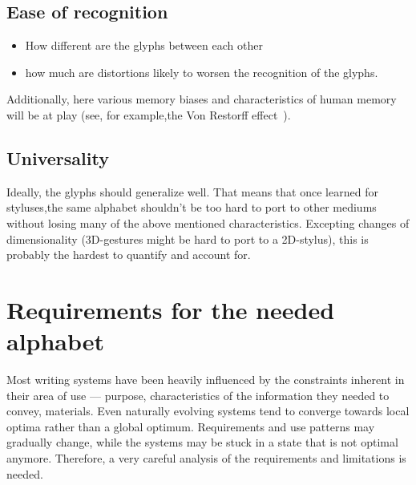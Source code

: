 \documentclass[conference]{IEEEtran}
\begin{document}
\subsection{Ease of recognition}

\begin{itemize} 
        \item How different are the glyphs between each other
        \item how much are distortions likely to worsen the recognition of the glyphs.
\end{itemize}

Additionally,  here various memory biases and characteristics of human memory will be at play (see, for example,the Von Restorff effect~\cite{hunt1995subtlety}).

\subsection{Universality}

Ideally, the glyphs should generalize well. That means that once learned for styluses,the same alphabet shouldn't be too hard to port to other mediums without losing many of the above mentioned characteristics. Excepting changes of dimensionality (3D-gestures might be hard to port to a 2D-stylus), this is probably the hardest to quantify and account for.

\section{Requirements for the needed alphabet}

Most writing systems have been heavily influenced by the constraints inherent in their area of use ---  purpose, characteristics of the information they needed to convey, materials. Even naturally evolving systems tend to converge towards local optima rather than a global optimum. Requirements and use patterns may gradually change, while the systems may be stuck in a state that is not optimal anymore. Therefore, a very careful analysis of the requirements and limitations is needed.
\end{document}
